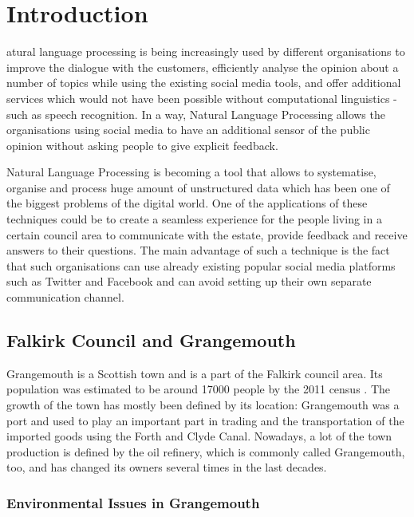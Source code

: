 \let\textcircled=\pgftextcircled
\chapter{Introduction}
\label{chap:intro}

atural language processing is being increasingly used by different organisations to  improve the dialogue with the customers, efficiently analyse the opinion about a number of topics while using the existing social media tools, and offer additional services which would not have been possible without computational linguistics - such as speech recognition. In a way, Natural Language Processing allows the organisations using social media to have an additional sensor of the public opinion without asking people to give explicit feedback.

Natural Language Processing is becoming a tool that allows to systematise, organise and process huge amount of unstructured data which has been one of the biggest problems of the digital world. One of the applications of these techniques could be to create a seamless experience for the people living in a certain council area to communicate with the estate, provide feedback and receive answers to their questions. The main advantage of such a technique is the fact that such organisations can use already existing popular social media platforms such as Twitter and Facebook and can avoid setting up their own separate communication channel. 

\section{Falkirk Council and Grangemouth}
\label{sec:falkirk}

Grangemouth is a Scottish town and is a part of the Falkirk council area. Its population was estimated to be around 17000 people by the 2011 census \cite{grangemouthcensus}. The growth of the town has mostly been defined by its location: Grangemouth was a port and used to play an important part in trading and the transportation of the imported goods using the Forth and Clyde Canal. Nowadays, a lot of the town production is defined by the oil refinery, which is commonly called Grangemouth, too, and has changed its owners several times in the last decades.

\subsection{Environmental Issues in Grangemouth}
\label{subsec:environment}

